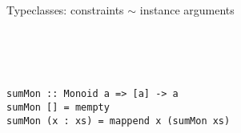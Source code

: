 \documentclass[aspectratio=169]{beamer}
\begin{document}
\begin{frame}[fragile]{Typeclasses: constraints $\sim$ instance arguments}

\hspace{-.7cm}
\begin{minipage}{.59\textwidth}%
\begin{code}%
\>[0]\AgdaSpace{}%
\AgdaSymbol{:}\AgdaSpace{}%
\AgdaSymbol{\{\{}\AgdaSpace{}%
\AgdaSpace{}%
\AgdaSpace{}%
\AgdaSymbol{\}\}}\AgdaSpace{}%
\AgdaSpace{}%
\AgdaSpace{}%
\AgdaSpace{}%
\AgdaSpace{}%
\<%
\\
\>[0]\AgdaSpace{}%
\AgdaInductiveConstructor{[]}%
\>[17]\AgdaSymbol{=}\AgdaSpace{}%
\<%
\\
\>[0]\AgdaSpace{}%
\AgdaSymbol{(}\AgdaSpace{}%
\AgdaSpace{}%
\AgdaSymbol{)}%
\>[17]\AgdaSymbol{=}\AgdaSpace{}%
\AgdaSpace{}%
\AgdaSpace{}%
\AgdaSymbol{(}\AgdaSpace{}%
\AgdaSymbol{)}\<%
\\
\>[0]\AgdaSymbol{\{-\#}\AgdaSpace{}%
\AgdaSpace{}%
\AgdaSpace{}%
\AgdaSpace{}%
\AgdaSymbol{\#-\}}\<%
\end{code}
\end{minipage}\hspace{-1cm}\vrule\hspace{.2cm}
\begin{minipage}{.41\textwidth}%
\begin{verbatim}
sumMon :: Monoid a => [a] -> a
sumMon [] = mempty
sumMon (x : xs) = mappend x (sumMon xs)
\end{verbatim}
\end{minipage}

\end{frame}
\end{document}
